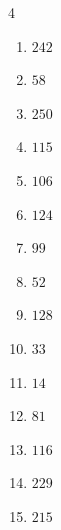 \begin{multicols}{4}
\begin{enumerate}

\columnbreak %

\resetques

  \item $242$


  \item $58$


  \item $250$


  \item $115$


  \item $106$


  \item $124$


  \item $99$


  \item $52$


  \item $128$


  \item $33$


  \item $14$


  \item $81$


  \item $116$


  \item $229$


  \item $215$


\end{enumerate}
\end{multicols}
